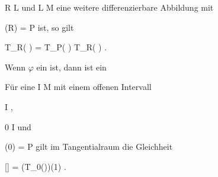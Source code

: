 {{{\mavergleichskette
{\vergleichskette
{R
}
{ \in }{ L
}
{  }{
}
{    }{
}
{   }{
}
}
{}{}{}
und
\maabbdisp {\psi} { L } { M
} {}
eine weitere differenzierbare Abbildung mit

\mavergleichskette
{\vergleichskette
{ \psi(R)
}
{ = }{ P
}
{  }{
}
{    }{
}
{   }{
}
}
{}{}{}
ist, so gilt

\mavergleichskettedisp
{\vergleichskette
{ T_R( \varphi \circ \psi)
}
{ =} { T_P( \varphi) \circ T_R( \psi)
}
{ } {
}
{ } {
}
{ } {
}
}
{}{}{.}
}{Wenn $\varphi$ ein
ist, dann ist
 ein
}{Für eine
\maabbdisp {\gamma} { I } { M
} {}
mit einem offenen Intervall

\mavergleichskette
{\vergleichskette
{I
}
{ \subseteq }{\R
}
{  }{
}
{    }{
}
{   }{
}
}
{}{}{,}

\mavergleichskette
{\vergleichskette
{ 0
}
{ \in }{ I
}
{  }{
}
{    }{
}
{   }{
}
}
{}{}{}
und

\mavergleichskette
{\vergleichskette
{ \gamma(0)
}
{ = }{ P
}
{  }{
}
{    }{
}
{   }{
}
}
{}{}{}
gilt im Tangentialraum
 die Gleichheit

\mavergleichskettedisp
{\vergleichskette
{ [\gamma]
}
{ =} { (T_0(\gamma))(1)
}
{ } {
}
{ } {
}
{ } {
}
}
{}{}{.}
}}
\faktzusatz {}
\faktzusatz {}

}
